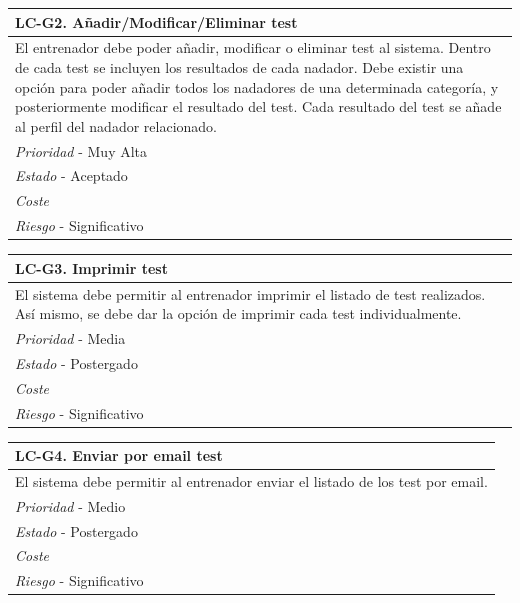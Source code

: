 	\begin{center}
		\begin{tabularx}{15cm}{|X|}
			\hline 
				\bf{LC-G2. Añadir/Modificar/Eliminar test}\\
			\hline
				El entrenador debe poder añadir, modificar o eliminar test al sistema. Dentro de cada test se incluyen los resultados de cada nadador. Debe existir una opción para poder añadir todos los nadadores de una determinada categoría, y posteriormente modificar el resultado del test. Cada resultado del test se añade al perfil del nadador relacionado.\\
			\hline
				{\it Prioridad} - Muy Alta\\
			\hline
				{\it Estado} - Aceptado\\
			\hline
				{\it Coste}\\
			\hline
				{\it Riesgo} - Significativo\\
			\hline
		\end{tabularx}
	\end{center}
	
	\begin{center}
		\begin{tabularx}{15cm}{|X|}
			\hline 
				\bf{LC-G3. Imprimir test}\\
			\hline
				El sistema debe permitir al entrenador imprimir el listado de test realizados. Así mismo, se debe dar la opción de imprimir cada test individualmente.\\
			\hline
				{\it Prioridad} - Media\\
			\hline
				{\it Estado} - Postergado\\
			\hline
				{\it Coste}\\
			\hline
				{\it Riesgo} - Significativo\\
			\hline
		\end{tabularx}
	\end{center}
	
	\begin{center}
		\begin{tabularx}{15cm}{|X|}
			\hline 
				\bf{LC-G4. Enviar por email test}\\
			\hline
				El sistema debe permitir al entrenador enviar el listado de los test por email.\\
			\hline
				{\it Prioridad} - Medio\\
			\hline
				{\it Estado} - Postergado\\
			\hline
				{\it Coste}\\
			\hline
				{\it Riesgo} - Significativo\\
			\hline
		\end{tabularx}
	\end{center}
	\bigskip %

